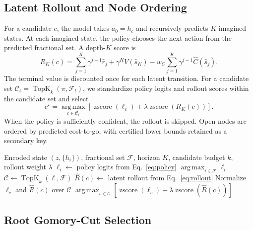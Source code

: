 \documentclass{article}
\newcommand{\argmax}{\operatorname*{arg\,max}}
\newcommand{\softmax}{\operatorname{softmax}}
\newcommand{\fracset}{\mathcal{F}}
\begin{document}
\subsection{Latent Rollout and Node Ordering}

For a candidate $c$, the model takes $a_0=h_c$ and recursively predicts $K$ imagined states. At each imagined state, the policy chooses the next action from the predicted fractional set. A depth-$K$ score is
\begin{equation}
  R_K(c)=
  \sum_{j=1}^{K}\gamma^{j-1}\widehat r_j
  +\gamma^{K}V(\widehat s_K)
  -w_C\sum_{j=1}^{K}\gamma^{j-1}\widehat C(\widehat s_j).
  \label{eq:rollout}
\end{equation}
The terminal value is discounted once for each latent transition. For a candidate set $\mathcal{C}_t=\operatorname{TopK}_k(\pi,\fracset_t)$, we standardize policy logits and rollout scores within the candidate set and select
\begin{equation}
  c^\star=
  \argmax_{c\in\mathcal{C}_t}
    \left[
      \operatorname{zscore}(\ell_c)
      +\lambda\operatorname{zscore}(R_K(c))
    \right].
  \label{eq:anchored-policy}
\end{equation}
When the policy is sufficiently confident, the rollout is skipped. Open nodes are ordered by predicted cost-to-go, with certified lower bounds retained as a secondary key.

\begin{algorithm}[t]
\caption{Policy-anchored latent branching}
\label{alg:branch}
\begin{algorithmic}[1]
\Require Encoded state $(z,\{h_i\})$, fractional set $\fracset$, horizon $K$,
         candidate budget $k$, rollout weight $\lambda$
\State $\ell_i\gets$ policy logits from Eq.~\eqref{eq:policy}
\If{$\max_{i\in\fracset}\softmax(\ell)_i\ge\theta$}
  \State \Return $\argmax_{i\in\fracset}\ell_i$
\EndIf
\State $\mathcal{C}\gets\operatorname{TopK}_k(\ell,\fracset)$
  \State $\widehat R(c)\gets$ latent rollout from Eq.~\eqref{eq:rollout}
\EndFor
\State Normalize $\ell_c$ and $\widehat R(c)$ over $\mathcal{C}$
\State \Return $\argmax_{c\in\mathcal{C}}
  [\operatorname{zscore}(\ell_c)+\lambda\operatorname{zscore}(\widehat R(c))]$
\end{algorithmic}
\end{algorithm}

\subsection{Root Gomory-Cut Selection}
\end{document}
